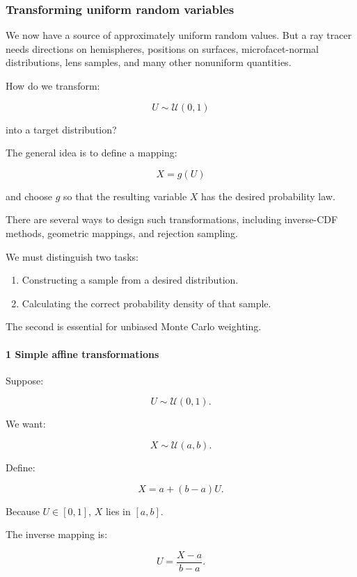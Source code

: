 \subsubsection{Transforming uniform random variables}\label{transforming-uniform-random-variables}

We now have a source of approximately uniform random values. But a ray tracer needs directions on hemispheres, positions on surfaces, microfacet-normal distributions, lens samples, and many other nonuniform quantities.

How do we transform:

\[
 U\sim\mathcal U(0,1)
\]

into a target distribution?

The general idea is to define a mapping:

\[
 \boxed{X=g(U)}
\]

and choose \(g\) so that the resulting variable \(X\) has the desired probability law.

There are several ways to design such transformations, including inverse-CDF methods, geometric mappings, and rejection sampling.

We must distinguish two tasks:

\begin{enumerate}
\def\labelenumi{\arabic{enumi}.}
\tightlist
\item
  Constructing a sample from a desired distribution.
\item
  Calculating the correct probability density of that sample.
\end{enumerate}

The second is essential for unbiased Monte Carlo weighting.

\paragraph{1 Simple affine transformations}\label{simple-affine-transformations}

Suppose:

\[
 U\sim\mathcal U(0,1).
\]

We want:

\[
 X\sim\mathcal U(a,b).
\]

Define:

\[
 \boxed{X=a+(b-a)U}.
\]

Because \(U\in[0,1]\), \(X\) lies in \([a,b]\).

The inverse mapping is:

\[
 U=\frac{X-a}{b-a}.
\]

